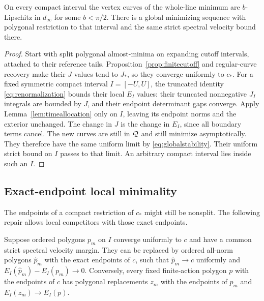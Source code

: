 \begin{proposition}\label{prop:localmargin}
On every compact interval the vertex curves of the whole-line minimum
are $b$-Lipschitz in $d_\infty$ for some $b<\pi/2$. There is a global
minimizing sequence with polygonal restriction to that interval and
the same strict spectral velocity bound there.
\end{proposition}

\begin{proof}
Start with split polygonal almost-minima on expanding cutoff intervals,
attached to their reference tails. Proposition~\ref{prop:finitecutoff}
and regular-curve recovery make their $J$ values tend to $J_*$, so
they converge uniformly to $c_*$. For a fixed symmetric compact
interval $I=[-U,U]$, the truncated identity
\eqref{eq:renormalization} bounds their local $E_I$ values: their
truncated nonnegative $J_I$ integrals are bounded by $J$, and their
endpoint determinant gaps converge. Apply
Lemma~\ref{lem:timeallocation} only on $I$, leaving its endpoint
norms and the exterior unchanged. The change in $J$ is the change
in $E_I$, since all boundary terms cancel. The new curves are still
in $\mathcal Q$ and still minimize asymptotically. They therefore have
the same uniform limit by \eqref{eq:globalstability}. Their uniform
strict bound on $I$ passes to that limit. An arbitrary compact
interval lies inside such an $I$.
\end{proof}

\subsection{Exact-endpoint local minimality}
The endpoints of a compact restriction of $c_*$ might still be nonsplit.
The following repair allows local competitors with those exact endpoints.

\begin{lemma}\label{lem:endpointrepair}
Suppose ordered polygons $p_m$ on $I$ converge uniformly to $c$ and
have a common strict spectral velocity margin. They can be replaced
by ordered all-norm polygons $\widehat p_m$ with the exact endpoints
of $c$, such that $\widehat p_m\to c$ uniformly and
$E_I(\widehat p_m)-E_I(p_m)\to0$.
Conversely, every fixed finite-action polygon $p$ with the endpoints
of $c$ has polygonal replacements $z_m$ with the endpoints of $p_m$
and $E_I(z_m)\to E_I(p)$.
\end{lemma}

